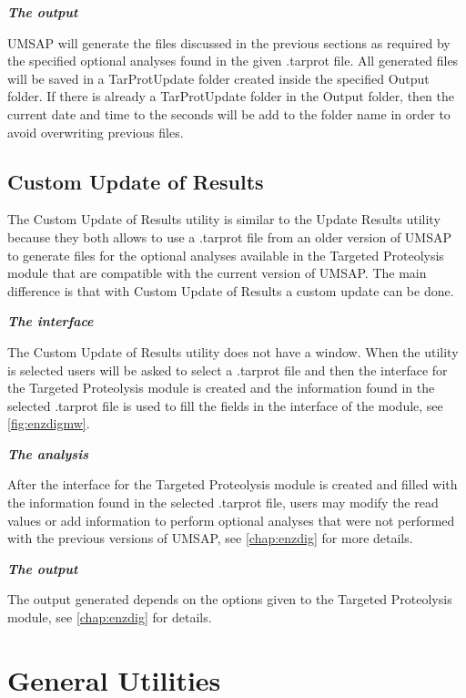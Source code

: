 \textit{\textbf{The output}}

UMSAP will generate the files discussed in the previous sections as required by the specified optional analyses found in the given .tarprot file. All generated files will be saved in a TarProtUpdate folder created inside the specified Output folder. If there is already a TarProtUpdate folder in the Output folder, then the current date and time to the seconds will be add to the folder name in order to avoid overwriting previous files. 

\subsection{Custom Update of Results }
\label{subsec:reanalyzetarprot}

The Custom Update of Results utility is similar to the Update Results utility because they both allows to use  a .tarprot file from an older version of UMSAP to generate files for the optional analyses available in the Targeted Proteolysis module that are compatible with the current version of UMSAP. The main difference is that with Custom Update of Results a custom update can be done.

\textit{\textbf{The interface}}

The Custom Update of Results utility does not have a window. When the utility is selected users will be asked to select a .tarprot file and then the interface for the Targeted Proteolysis module is created and the information found in the selected .tarprot file is used to fill the fields in the interface of the module, see \autoref{fig:enzdigmw}.

\textit{\textbf{The analysis}}

After the interface for the Targeted Proteolysis module is created and filled with the information found in the selected .tarprot file, users may modify the read values or add information to perform optional analyses that were not performed with the previous versions of UMSAP, see \autoref{chap:enzdig} for more details.

\textit{\textbf{The output}}    

The output generated depends on the options given to the Targeted Proteolysis module, see \autoref{chap:enzdig} for details.

\section{General Utilities}

